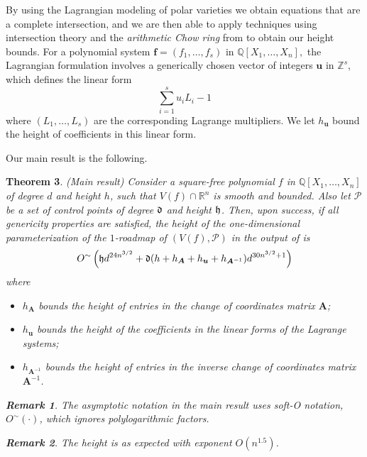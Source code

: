 \documentclass[12pt]{article}
\def\mA{{\bm A}}
\newtheorem{theorem}{Theorem}[section]
\newtheorem{remark}[theorem]{Remark}
\def\mA{{\bm A}}
\begin{document}
By using the Lagrangian modeling of polar varieties we obtain equations that are a complete intersection, and we are then able to apply techniques using intersection theory and the \textit{arithmetic Chow ring} from \cite{EN} to obtain our height bounds. For a polynomial system $\bm f = (f_1,\hdots,f_s)$ in $\mathbb{Q}[X_1,\hdots,X_n],$ the Lagrangian formulation involves a generically chosen vector of integers $\bm u$ in $\mathbb{Z}^{s}$, which defines the linear form
\[
\sum_{i=1}^{s}u_iL_i-1
\]
where $(L_1,\hdots,L_s)$ are the corresponding Lagrange multipliers. We let $h_{\bm u}$ bound the height of coefficients in this linear form.



\noindent 
Our main result is the following. 
%





\begin{theorem}\label{theorem:mainHeight} (Main result)
     Consider a square-free polynomial $f$ in $\mathbb{Q}[X_1, \dots, X_n]$ of degree $d$ and height $h$, such that $V(f) \cap \mathbb{R}^n$ is smooth and bounded. Also let $\mathscr{P}$ be a set of control points  of degree $\frak{d}$ and height $\frak{h}$. Then, upon success, if all genericity properties are satisfied, the height of the one-dimensional parameterization of the $1$-roadmap of $(V(f),\mathscr{P})$ in the output of \cite[MainRoadmap]{SchostMohabBabySteps2011} is
\[
O^{\sim}\left( \frak{h}d^{24n^{3/2}} + \frak{d}(h+h_{\mA}+h_{\bm u} + h_{\mA^{-1}})d^{30n^{3/2}+1}\right)
\]
    where 
\begin{itemize}
    \item $h_{\mA}$ bounds the height of entries in the change of coordinates matrix $\mA$; 
    \item $h_{\bm u}$ bounds the height of the coefficients in the linear forms of the Lagrange systems; 
    \item $h_{\mA^{-1}}$ bounds the height of entries in the inverse change of coordinates matrix $\mA^{-1}$.
\end{itemize}
\begin{remark}
    The asymptotic notation in the main result uses soft-O notation, $O^{\sim}(\cdot)$, which ignores polylogarithmic factors. 
\end{remark}
\begin{remark}
    The height is as expected with exponent $O(n^{1.5})$. 
\end{remark}
\end{theorem}
%
\end{document}
